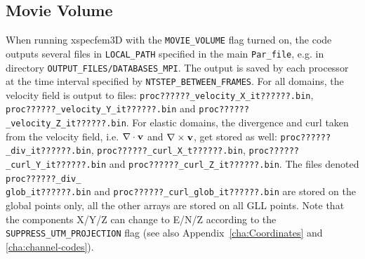 \subsection{Movie Volume}\label{sub:Movie-Volume}

When running xspecfem3D with the \texttt{\small MOVIE\_VOLUME}{\small{}
flag turned on, the code outputs several files in }\texttt{\small LOCAL\_PATH}{\small{}
specified in the main }\texttt{\small Par\_file}{\small , e.g. in
directory }\texttt{\small OUTPUT\_FILES/DATABASES\_MPI}{\small .
The output is saved by each processor at the time interval specified
by }\texttt{\small NTSTEP\_BETWEEN\_FRAMES}{\small . For all domains,
the velocity field is output to files: }\texttt{\small proc??????\_velocity\_X\_it??????.bin}{\small ,
}\texttt{\small proc??????\_velocity\_Y\_it??????.bin}{\small{} and
}\texttt{\small proc??????\_velocity\_Z\_it??????.bin}{\small . For
elastic domains, the divergence and curl taken from the velocity field,
i.e. $\nabla\cdot{\bf {v}}$ and $\nabla\times{\bf {v}}$, get stored
as well: }\texttt{\small proc??????\_div\_it??????.bin}{\small , }\texttt{\small proc??????\_curl\_X\_t??????.bin}{\small ,
}\texttt{\small proc??????\_curl\_Y\_it??????.bin}{\small{} and }\texttt{\small proc??????\_curl\_Z\_it??????.bin}{\small .
The files denoted }\texttt{\small proc??????\_div\_}{\small ~}\\
{\small{} }\texttt{\small glob\_it??????.bin}{\small{} and }\texttt{\small proc??????\_curl\_glob\_it??????.bin}{\small{}
are stored on the global points only, all the other arrays are stored
on all GLL points. Note that the components X/Y/Z can change to E/N/Z
according to the }\texttt{\small SUPPRESS\_UTM\_PROJECTION}{\small{}
flag (see also Appendix~\ref{cha:Coordinates} and \ref{cha:channel-codes}).}{\small \par}

